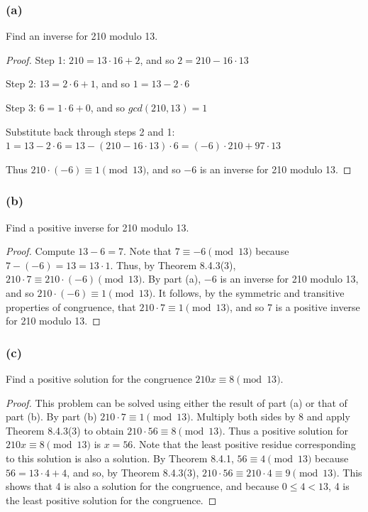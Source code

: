 \documentclass[14pt]{extarticle}
\newcommand{\cy}{\color{cyan}}
\begin{document}
\subsubsection{(a)}
Find an inverse for 210 modulo 13.

\begin{proof}
{\cy Step 1:} \(210 = 13 \cdot 16 + 2\), and so \(2 = 210 - 16 \cdot 13\)

{\cy Step 2:} \(13 = 2 \cdot 6 + 1\), and so \(1 = 13 - 2 \cdot 6\)

{\cy Step 3:} \(6 = 1 \cdot 6 + 0\), and so \(gcd(210, 13) = 1\)

Substitute back through steps 2 and 1: 
\(1 = 13 - 2 \cdot 6 = 13 - (210 - 16 \cdot 13) \cdot 6 = (-6) \cdot 210 + 97 \cdot 13\)

Thus \(210 \cdot (-6) \equiv 1 \pmod{13}\), and so \(-6\) is an inverse for 210 modulo 13.
\end{proof}

\subsubsection{(b)}
Find a positive inverse for 210 modulo 13.

\begin{proof}
Compute \(13 - 6 = 7\). Note that \(7 \equiv -6 \pmod{13}\) because \(7 - (-6) = 13 = 13 \cdot 1\). Thus, by Theorem 
8.4.3(3), \(210 \cdot 7 \equiv 210 \cdot (-6) \pmod{13}\). By part (a), \(-6\) is an inverse for 210 modulo 13, and so 
\(210 \cdot (-6) \equiv 1 \pmod{13}\). It follows, by the symmetric and transitive properties of congruence, that 
\(210 \cdot 7 \equiv 1 \pmod{13}\), and so 7 is a positive inverse for 210 modulo 13.
\end{proof}

\subsubsection{(c)}
Find a positive solution for the congruence \(210x \equiv 8 \pmod{13}\).

\begin{proof}
This problem can be solved using either the result of part (a) or that of part (b). By part (b) \(210 \cdot 7 \equiv 1 
\pmod{13}\). Multiply both sides by 8 and apply Theorem 8.4.3(3) to obtain \(210\cdot 56 \equiv 8 \pmod{13}\). Thus 
a positive solution for \(210x \equiv 8 \pmod{13}\) is \(x = 56\). Note that the least positive residue corresponding 
to this solution is also a solution. By Theorem 8.4.1, \(56 \equiv 4 \pmod{13}\) because \(56 = 13 \cdot 4 + 4\), and 
so, by Theorem 8.4.3(3), \(210 \cdot 56 \equiv 210 \cdot 4 \equiv 9 \pmod{13}\). This shows that 4 is also a solution 
for the congruence, and because \(0 \leq 4 < 13\), 4 is the least positive solution for the congruence.
\end{proof}
\end{document}
